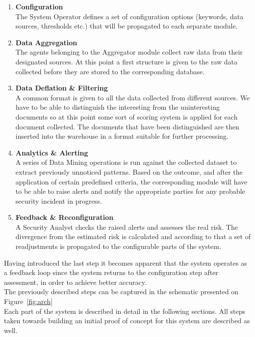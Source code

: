 \documentclass[12pt]{article}
\begin{document}
\begin{enumerate}
	\item \textbf{Configuration}\\ 
	The System Operator defines a set of configuration options (keywords, data sources, thresholds etc.) that will be propagated to each separate module.
	\item \textbf{Data Aggregation}\\
	The agents belonging to the Aggregator module collect raw data from their designated sources. At this point a first structure is given to the raw data collected before they are stored to the corresponding database. 
	\item \textbf{Data Deflation \& Filtering}\\
	A common format is given to all the data collected from different sources. We have to be able to distinguish the interesting from the uninteresting documents so at this point some sort of scoring system is applied for each document collected. The documents that have been distinguished are then inserted into the warehouse in a format suitable for further processing.
	\item \textbf{Analytics \& Alerting}\\
	A series of Data Mining operations is run against the collected dataset to extract previously unnoticed patterns. Based on the outcome, and after the application of certain predefined criteria, the corresponding module will have to be able to raise alerts and notify the appropriate parties for any probable security incident in progress.
	\item \textbf{Feedback \& Reconfiguration}\\
	A Security Analyst checks the raised alerts and assesses the real risk. The divergence from the estimated risk is calculated and according to that a set of readjustments is propagated to the configurable parts of the system.
\end{enumerate}

\noindent Having introduced the last step it becomes apparent that the system operates as a feedback loop since the system returns to the configuration step after assessment, in order to achieve better accuracy. \\

\noindent The previously described steps can be captured in the schematic presented on Figure~\ref{fig:arch}\\
\noindent Each part of the system is described in detail in the following sections. All steps taken towards building an initial proof of concept for this system are described as well. \\
\end{document}
